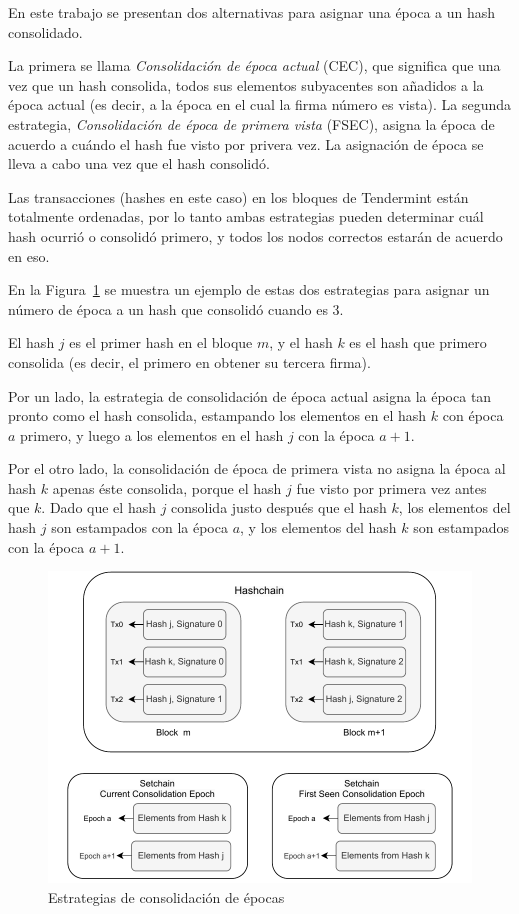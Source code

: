 %

En este trabajo se presentan dos alternativas para asignar una época a un hash consolidado.

%
La primera se llama \textit{Consolidación de época actual} (CEC), que significa que 
una vez que un hash consolida, todos sus elementos subyacentes son añadidos a la época actual
(es decir, a la época en el cual la firma número \SPH es vista).
%
La segunda estrategia, \textit{Consolidación de época de primera vista} (FSEC), asigna la época
de acuerdo a cuándo el hash fue visto por privera vez. La asignación de época se lleva
a cabo una vez que el hash consolidó. 

%
Las transacciones (hashes en este caso) en los bloques de Tendermint están totalmente ordenadas,
por lo tanto ambas estrategias pueden determinar cuál hash ocurrió o consolidó primero, y
todos los nodos correctos estarán de acuerdo en eso.

%

En la Figura~\ref{fig:consolidation_epoch} se muestra un ejemplo de estas dos estrategias para asignar
un número de época a un hash que consolidó cuando \SPH es 3.

%
El hash $j$ es el primer hash en el bloque $m$, y el hash $k$ es el hash que primero consolida
(es decir, el primero en obtener su tercera firma).

%
Por un lado, la estrategia de consolidación de época actual asigna la época tan pronto como
el hash consolida, estampando los elementos en el hash $k$ con época $a$ primero, y luego
a los elementos en el hash $j$ con la época $a+1$.

%
Por el otro lado, la consolidación de época de primera vista no asigna la época al hash $k$
apenas éste consolida, porque el hash $j$ fue visto por primera vez antes que $k$.
%
Dado que el hash $j$ consolida justo después que el hash $k$, los elementos del hash $j$ son
estampados
con la época $a$, y los elementos del hash $k$ son estampados con la época $a+1$. 


\begin{figure}
  \centering
  \includegraphics[scale=0.7]{figures/consolidation_epoch.pdf}
  \caption{Estrategias de consolidación de épocas}
  \label{fig:consolidation_epoch}
\end{figure}

